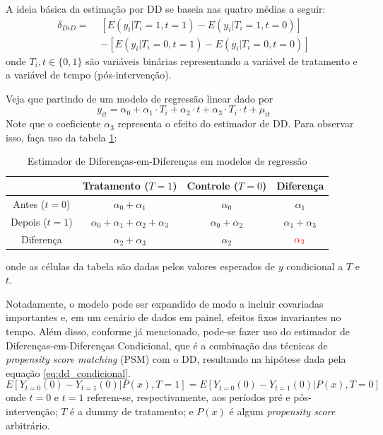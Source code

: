 A ideia básica da estimação por DD se baseia nas quatro médias a seguir:
\begin{equation} \label{eq:diff-diff} \tag{3.1.5} 
\begin{aligned}
\delta_{DiD} = \,\, &[E(y_i|T_i = 1, t = 1) - E(y_i|T_i = 1, t = 0)] \nonumber \\ &- [E(y_i|T_i = 0, t = 1) - E(y_i|T_i = 0, t = 0)]
\end{aligned}
\end{equation}
onde $T_i, t \in \{0,1\}$ são variáveis binárias representando a variável de tratamento e a variável de tempo (pós-intervenção).

Veja que partindo de um modelo de regressão linear dado por
\begin{equation} \label{eq:diff-diff-regressão} \tag{3.1.6}
y_{it} = \alpha_0 + \alpha_1 \cdot T_i + \alpha_2 \cdot t + \alpha_3 \cdot T_i \cdot t + \mu_{it}
\end{equation}
Note que o coeficiente $\alpha_3$ representa o efeito do estimador de DD. Para observar isso, faça uso da tabela \ref{tab:diff-diff}:

\begin{table}[H] \centering
\caption{Estimador de Diferenças-em-Diferenças em modelos de regressão}
\label{tab:diff-diff}
\begin{tabular}{c|ccc}
& Tratamento ($T = 1$) & Controle ($T = 0$) & Diferença \\ \hline Antes ($t=0$) & $\alpha_0 + \alpha_1$ & $\alpha_0$ & $\alpha_1$ \\ Depois ($t=1$) & $\alpha_0 + \alpha_1 + \alpha_2 + \alpha_3$ & $\alpha_0 + \alpha_2$ & $\alpha_1 +\alpha_3$ \\ Diferença & $\alpha_2 + \alpha_3$ & $\alpha_2$ & $\color{red}\alpha_3$
\end{tabular}
\end{table}
onde as células da tabela são dadas pelos valores esperados de $y$ condicional a $T$ e $t$.

Notadamente, o modelo pode ser expandido de modo a incluir covariadas importantes e, em um cenário de dados em painel, efeitos fixos invariantes no tempo. Além disso, conforme já mencionado, pode-se fazer uso do estimador de Diferenças-em-Diferenças Condicional, que é a combinação das técnicas de \textit{propensity score matching} (PSM) com o DD, resultando na hipótese dada pela equação \ref{eq:dd_condicional}.
\begin{equation} \label{eq:dd_condicional} \tag{3.1.7}
E[Y_{t=0}(0)-Y_{t=1}(0)|P(x),T=1]= E[Y_{t=0}(0)-Y_{t=1}(0)|P(x),T=0]
\end{equation}
onde $t = 0$ e $t = 1$ referem-se, respectivamente, aos períodos pré e pós-intervenção; $T$ é a dummy de tratamento; e $P(x)$ é algum \textit{propensity score} arbitrário.

